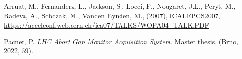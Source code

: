 {\begin{thebibliography}{99}
         Arruat, M., Fernanderz, L., Jackson, S., Locci, F., Nougaret, J.L., Peryt, M., Radeva, A., Sobczak, M., Vanden Eynden, M., (2007), ICALEPCS2007, \url{https://accelconf.web.cern.ch/ica07/TALKS/WOPA04_TALK.PDF}
        
        Pacner, P. \emph{LHC Abort Gap Monitor
            Acquisition System}. Master thesis, (Brno, 2022, 59).


            


        











% 

    \end{thebibliography}
} %
